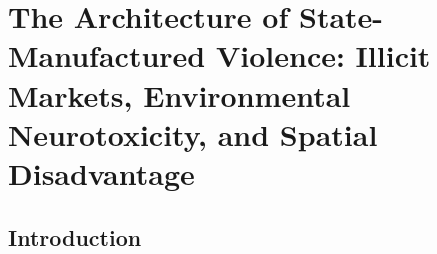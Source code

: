 \documentclass[
]{article}
\author{Emmanuel Theodore}
\date{}
\begin{document}
\section{\texorpdfstring{\textbf{The Architecture of State-Manufactured
Violence: Illicit Markets, Environmental Neurotoxicity, and Spatial
Disadvantage}}{The Architecture of State-Manufactured Violence: Illicit Markets, Environmental Neurotoxicity, and Spatial Disadvantage}}\label{the-architecture-of-state-manufactured-violence-illicit-markets-environmental-neurotoxicity-and-spatial-disadvantage}

\subsection{\texorpdfstring{\textbf{Introduction}}{Introduction}}\label{introduction}
\end{document}
